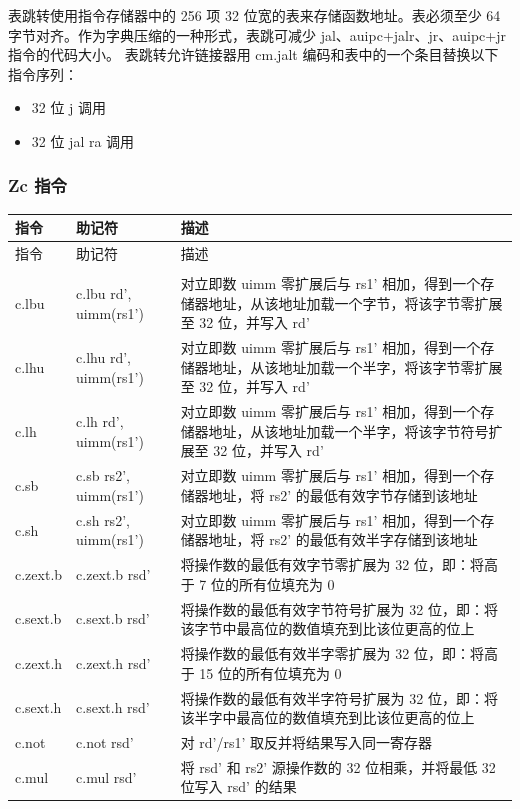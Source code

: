 \documentclass[main\_\_CN.tex]{subfiles}
\begin{document}
表跳转使用指令存储器中的 256 项 32 位宽的表来存储函数地址。表必须至少 64 字节对齐。作为字典压缩的一种形式，表跳可减少 jal、auipc+jalr、jr、auipc+jr 指令的代码大小。
表跳转允许链接器用 cm.jalt 编码和表中的一个条目替换以下指令序列：
\begin{itemize}
    \item 32 位 j 调用
    \item 32 位 jal ra 调用
\end{itemize}

\subsubsection{Zc 指令}
\label{sec:riscvcpu-zc-insn-descr}

\begin{longtable}{ | p{2.0cm} | p{4.0cm} |  p{10.0cm} | }
\hline\rowcolor{lightgray}
指令 & 助记符 & 描述  \\ \hline
\endfirsthead
\hline
\rowcolor{lightgray}
指令 & 助记符 & 描述  \\ \hline
\hline
\endhead
\endfoot

\multicolumn{3}{|l|}{\textbf{Zcb 扩展}} \\\hline
c.lbu & c.lbu rd', uimm(rs1') & 对立即数 uimm 零扩展后与 rs1' 相加，得到一个存储器地址，从该地址加载一个字节，将该字节零扩展至 32 位，并写入 rd' \\\hline
c.lhu & c.lhu rd', uimm(rs1') &  对立即数 uimm 零扩展后与 rs1' 相加，得到一个存储器地址，从该地址加载一个半字，将该字节零扩展至 32 位，并写入 rd'\\\hline
c.lh & c.lh rd', uimm(rs1') & 对立即数 uimm 零扩展后与 rs1' 相加，得到一个存储器地址，从该地址加载一个半字，将该字节符号扩展至 32 位，并写入 rd' \\\hline
c.sb & c.sb rs2', uimm(rs1') & 对立即数 uimm 零扩展后与 rs1' 相加，得到一个存储器地址，将 rs2' 的最低有效字节存储到该地址 \\\hline
c.sh & c.sh rs2', uimm(rs1') &  对立即数 uimm 零扩展后与 rs1' 相加，得到一个存储器地址，将 rs2' 的最低有效半字存储到该地址  \\\hline
c.zext.b & c.zext.b rsd' & 将操作数的最低有效字节零扩展为 32 位，即：将高于 7 位的所有位填充为 0 \\\hline
c.sext.b & c.sext.b rsd' & 将操作数的最低有效字节符号扩展为 32 位，即：将该字节中最高位的数值填充到比该位更高的位上  \\\hline
c.zext.h & c.zext.h rsd' &  将操作数的最低有效半字零扩展为 32 位，即：将高于 15 位的所有位填充为 0 \\\hline
c.sext.h  & c.sext.h rsd'  &  将操作数的最低有效半字符号扩展为 32 位，即：将该半字中最高位的数值填充到比该位更高的位上 \\\hline
c.not & c.not rsd' & 对 rd'/rs1' 取反并将结果写入同一寄存器 \\\hline
c.mul & c.mul rsd' & 将 rsd' 和 rs2' 源操作数的 32 位相乘，并将最低 32 位写入 rsd' 的结果 \\\hline


\end{longtable}
\end{document}
